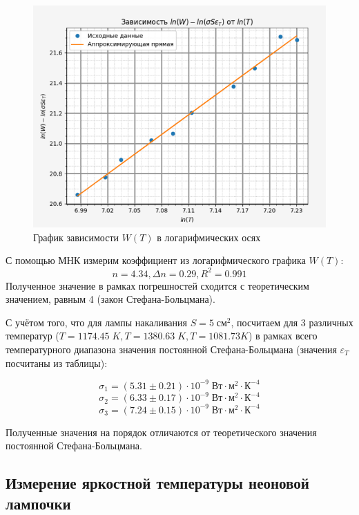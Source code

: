 \documentclass[a4paper, 12pt]{article}%
\begin{document}
    \begin{figure}[h!]
        \centering
        \includegraphics[width = 13 cm]{WT_log.png}
        \caption{График зависимости $W(T)$ в логарифмических осях}
        \label{}
    \end{figure}
    
    С помощью МНК измерим коэффициент из логарифмического графика $W(T)$:
    \begin{equation*}
        n = 4.34, \Delta n = 0.29, R^2 = 0.991
    \end{equation*}
    Полученное значение в рамках погрешностей сходится с теоретическим значением, равным 4 (закон Стефана-Больцмана).

    С учётом того, что для лампы накаливания $S = 5 \; \text{см}^2$, посчитаем для 3 различных температур ($T = 1174.45 \; K, T = 1380.63 \; K, T = 1081.73 K$) в рамках всего температурного диапазона значения постоянной Стефана-Больцмана (значения $\varepsilon_T$ посчитаны из таблицы):

    $$ \sigma_1 = (5.31 \pm 0.21) \cdot 10^{-9} \; \text{Вт} \cdot \text{м}^2 \cdot \text{К}^{-4} $$
    $$ \sigma_2 = (6.33 \pm 0.17) \cdot 10^{-9} \; \text{Вт} \cdot \text{м}^2 \cdot \text{К}^{-4} $$
    $$ \sigma_3 = (7.24 \pm 0.15) \cdot 10^{-9} \; \text{Вт} \cdot \text{м}^2 \cdot \text{К}^{-4} $$
    
    Полученные значения на порядок отличаются от теоретического значения постоянной Стефана-Больцмана.

\subsection{Измерение яркостной температуры неоновой лампочки}
\end{document}

